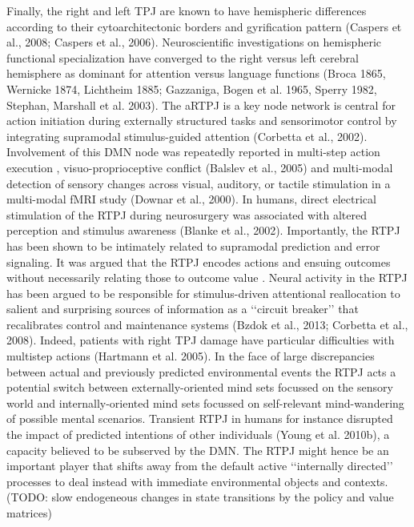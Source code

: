 \documentclass{article} %
\begin{document}
Finally,
the right and left TPJ are known to have hemispheric differences
according to their cytoarchitectonic borders and gyrification pattern
(Caspers et al., 2008; Caspers et al., 2006).
Neuroscientific investigations on hemispheric functional specialization
have converged to the right versus left cerebral hemisphere as dominant for
attention versus language functions (Broca 1865, Wernicke 1874, Lichtheim 1885;
Gazzaniga, Bogen et al. 1965, Sperry 1982, Stephan, Marshall et al. 2003).
%
The aRTPJ is a key node network is central for
action initiation during externally structured tasks and
sensorimotor control by integrating supramodal stimulus-guided attention
(Corbetta et al., 2002).
Involvement of this DMN node was repeatedly reported in
multi-step action execution \citep{hartmann2005takes},
visuo-proprioceptive conflict (Balslev et al., 2005) and
multi-modal detection of sensory changes across
visual, auditory, or tactile stimulation in a multi-modal fMRI study
(Downar et al., 2000).
In humans, direct electrical stimulation of the
RTPJ during neurosurgery was associated with altered perception
and stimulus awareness (Blanke et al., 2002).
%
Importantly, the RTPJ has been shown to be intimately related to
supramodal prediction and error signaling.
It was argued that the RTPJ encodes actions and ensuing outcomes
without necessarily relating those to outcome value
\citep{liljeholm2013neural, hamilton2008action,
jakobs2009effects}.
Neural activity in the RTPJ has been argued to be responsible
for stimulus-driven attentional reallocation to
salient and surprising sources of information
as a ‘‘circuit breaker’’ that recalibrates control and maintenance systems
(Bzdok et al., 2013; Corbetta et al., 2008).
Indeed, patients with right TPJ damage have particular difficulties
with multistep actions (Hartmann et al. 2005).
In the face of large discrepancies between actual and previously predicted
environmental events the RTPJ acts a potential switch between
externally-oriented mind sets focussed on the
sensory world and internally-oriented mind sets focussed
on self-relevant mind-wandering of possible mental scenarios.
Transient RTPJ in humans for instance disrupted the
impact of predicted intentions of other individuals (Young et al. 2010b),
a capacity believed to be subserved by the DMN.
The RTPJ might hence be an important player that shifts away
from the default active ‘‘internally directed’’ processes
to deal instead with immediate environmental objects and contexts.
(TODO: slow endogeneous changes in state transitions by the policy and value matrices)
\end{document}
